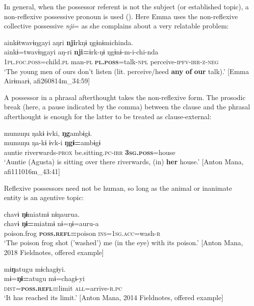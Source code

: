 \documentclass[output=paper]{langscibook}
\begin{document}
In general, when the possessor referent is not the subject (or established topic), a non-reflexive possessive pronoun is used (). Here Emma uses the non-reflexive collective possessive \textit{nji}= as she complains about a very relatable problem:

\ea\label{ex:brooks:13}
\glll ainkɨtwavɨŋgayi aŋri \textbf{nji}rkŋɨ   ŋgɨnɨmichinda.\\
ainkɨ=twavɨŋgayi aŋ-ri \textbf{nji=}ɨrk-ŋɨ   ŋgɨnɨ-m-i-chi-nda\\
\textsc{1pl.foc.poss}=child.\textsc{pl} man-\textsc{pl}  \textbf{\textsc{pl.poss}}=talk-\textsc{npl} perceive\textsc{-ipfv-irr-z-neg}\\
 \glt `The young men of ours don't listen (lit. perceive/heed \textbf{any} \textbf{of} \textbf{our} talk).'
[Emma Airɨmarɨ, afi260814m\_34:59]
\z


A possessor in a phrasal afterthought takes the non-reflexive form. The prosodic break (here, a pause indicated by the comma) between the clause and the phrasal afterthought is enough for the latter to be treated as clause-external:

\ea\label{ex:brooks:14}
\glll mumuŋu  ŋakɨ ɨvki, \textbf{ŋg}ambɨgɨ. \\
 mumuŋu  ŋa-kɨ ɨvk-i \textbf{ŋgɨ=}ambɨgɨ\\
auntie   riverwards-\textsc{prox}  be.sitting.\textsc{pc-irr}  \textbf{\textsc{3sg.poss}}=house\\
\glt `Auntie (Agusta) is sitting over there riverwards, (in) \textbf{her} house.'
 [Anton Mana, afi111016m\_43:41]
\z


Reflexive possessors need not be human, so long as the animal  or inanimate entity  is an agentive topic:

\ea\label{ex:brooks:15}
\glll chavɨ   \textbf{ŋɨ}miatmɨ   nɨŋaurua.\\
chavɨ \textbf{ŋɨ=}miatmɨ   nɨ=ŋɨ=auru-a\\
poison.frog  \textbf{\textsc{poss.refl=}}poison  \textsc{ins=1sg.acc}=wash-\textsc{r}\\
\glt `The poison frog shot ('washed') me (in the eye) with its poison.'
[Anton Mana, 2018 Fieldnotes, offered example]
\z


\ea\label{ex:brooks:16}
\glll mɨ\textbf{ŋ}atugu mɨchagɨyi.\\
mɨ=\textbf{ŋɨ=}atugu mɨ=chagɨ-yi\\
\textsc{dist=}\textbf{\textsc{poss.refl}}\textbf{=}limit  \textsc{all}=arrive-\textsc{r.pc}\\
\glt `It has reached its limit.' [Anton Mana, 2014 Fieldnotes, offered example]
\z
\end{document}
